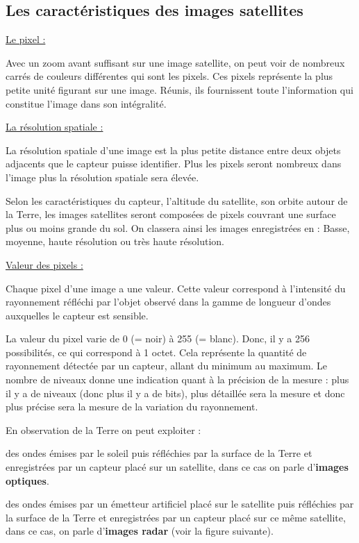 \documentclass[12pt, openany]{report}
\begin{document}
\subsection{Les caractéristiques des images satellites}

\par
\underline{Le pixel :}
\par

Avec un zoom avant suffisant sur une image satellite, on peut voir de nombreux carrés de couleurs différentes qui sont les pixels.
Ces pixels représente la plus petite unité figurant sur une image. Réunis, ils fournissent toute l’information qui constitue l’image dans son intégralité.

\par
\underline{La résolution spatiale :}
\par 

La résolution spatiale d’une image est la plus petite distance entre deux objets adjacents que le capteur puisse identifier.
Plus les pixels seront nombreux dans l’image plus la résolution spatiale sera élevée.
\par
Selon les caractéristiques du capteur, l’altitude du satellite, son orbite autour de la Terre, les images satellites seront composées de pixels couvrant une surface plus ou moins grande du sol. On classera ainsi les images enregistrées en : Basse, moyenne, haute résolution ou très haute résolution.

\par
\underline{Valeur des pixels :}
\par 

Chaque pixel d’une image a une valeur. Cette valeur correspond à l’intensité du rayonnement réfléchi par l’objet observé dans la gamme de longueur d’ondes auxquelles le capteur est sensible. \cite{ref3}

La valeur du pixel varie de 0 (= noir) à 255 (= blanc). Donc, il y a 256 possibilités, ce qui correspond à 1 octet. Cela représente la quantité de rayonnement détectée par un capteur, allant du minimum au maximum. Le nombre de niveaux donne une indication quant à la précision de la mesure : plus il y a de niveaux (donc plus il y a de bits), plus détaillée sera la mesure et donc plus précise sera la mesure de la variation du rayonnement.

\par
En observation de la Terre on peut exploiter :
\begin{mylist}
\item
des ondes émises par le soleil puis réfléchies par la surface de la Terre et enregistrées par un capteur placé sur un satellite, dans ce cas  on parle d'\textbf{images optiques}.
\item
des ondes émises par un émetteur artificiel placé sur le satellite puis réfléchies par la surface de la Terre et enregistrées par un capteur placé sur ce même satellite, dans ce cas, on parle d'\textbf{images radar} (voir la figure suivante).
\end{mylist}
\end{document}
